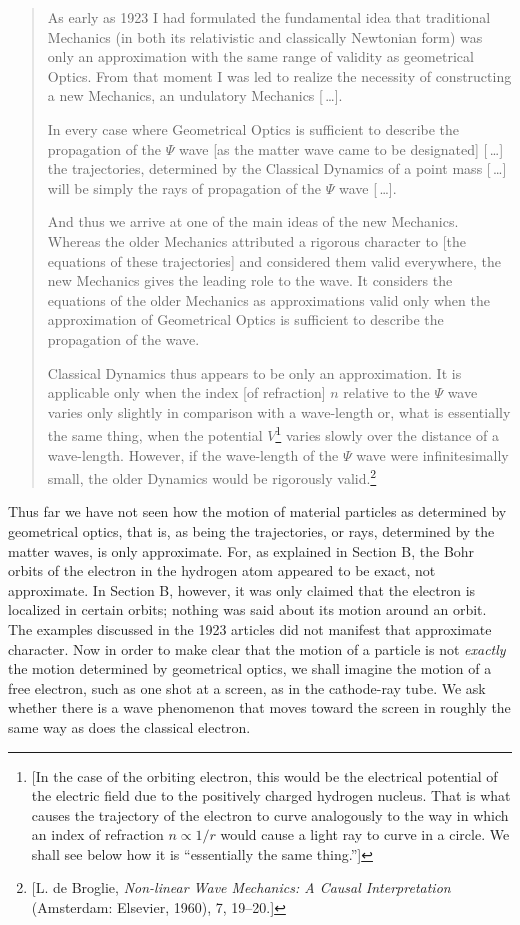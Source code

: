 \begin{quotation}
As early as 1923 I had formulated the fundamental idea that traditional
Mechanics (in both its relativistic and classically Newtonian form) was
only an approximation with the same range of validity as geometrical
Optics. From that moment I was led to realize the necessity of
constructing a new Mechanics, an undulatory Mechanics [\,\ldots].

In every case where Geometrical Optics is sufficient to describe the
propagation of the $\Psi$ wave {[}as the matter wave came to be
designated{]} [\,\ldots] the trajectories, determined by the Classical
Dynamics of a point mass [\,\ldots] will be simply the rays of propagation of
the $\Psi$ wave [\,\ldots].

And thus we arrive at one of the main ideas of the new Mechanics.
Whereas the older Mechanics attributed a rigorous character to {[}the
equations of these trajectories{]} and considered them valid everywhere,
the new Mechanics gives the leading role to the wave. It considers the
equations of the older Mechanics as approximations valid only when the
approximation of Geometrical Optics is sufficient to describe the
propagation of the wave.

Classical Dynamics thus appears to be only an approximation. It is
applicable only when the index {[}of refraction{]} $n$ relative to
the $\Psi$ wave varies only slightly in comparison with a wave-length
or, what is essentially the same thing, when the potential
$V$\footnote{{[}In the case of the orbiting electron, this would be
  the electrical potential of the electric field due to the positively
  charged hydrogen nucleus. That is what causes the trajectory of the
  electron to curve analogously to the way in which an index of
  refraction $n \propto 1/r$ would cause a light ray to curve in a
  circle. We shall see below how it is ``essentially the same
  thing.''{]}} varies slowly over the distance of a wave-length.
However, if the wave-length of the $\Psi$ wave were infinitesimally
small, the older Dynamics would be rigorously valid.\footnote{{[}L. de
  Broglie, \emph{Non-linear Wave Mechanics: A Causal Interpretation}
  (Amsterdam: Elsevier, 1960), 7, 19--20.{]}}
\end{quotation}

Thus far we have not seen how the motion of material particles as
determined by geometrical optics, that is, as being the trajectories, or
rays, determined by the matter waves, is only approximate. For, as
explained in Section B, the Bohr orbits of the electron in the hydrogen
atom appeared to be exact, not approximate. In Section B, however, it
was only claimed that the electron is localized in certain orbits;
nothing was said about its motion around an orbit. The examples
discussed in the 1923 articles did not manifest that approximate
character. Now in order to make clear that the motion of a particle is
not \emph{exactly} the motion determined by geometrical optics, we shall
imagine the motion of a free electron, such as one shot at a screen, as
in the cathode-ray tube. We ask whether there is a wave phenomenon that
moves toward the screen in roughly the same way as does the classical
electron.

